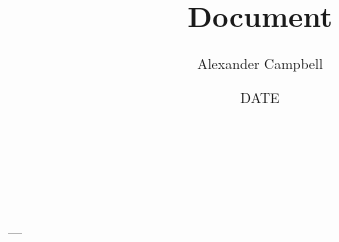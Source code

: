 \documentclass[12pt,letterpaper]{article}
\title{Document}
\author{Alexander Campbell}
\date{DATE}
\begin{document}
\noindent
\textbf{\thetitle{}} \\
\textbf{\theauthor{}} \\
\textbf{\thedate{}} \\
---
\end{document}
